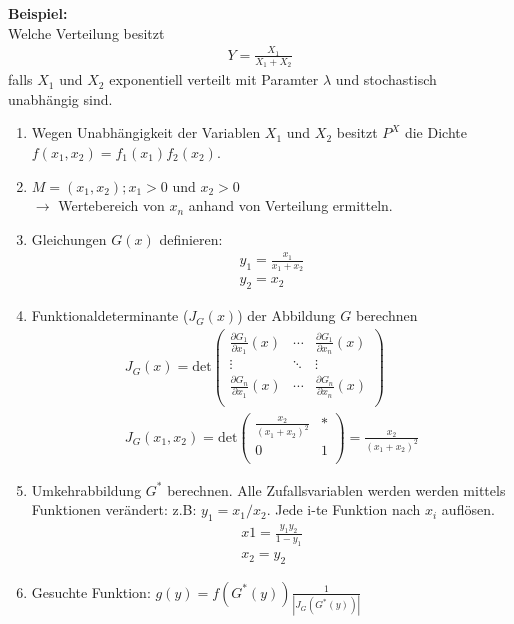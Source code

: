 \documentclass{article}
\begin{document}
\textbf{Beispiel:}\\
Welche Verteilung besitzt
\begin{align}
	Y = \frac{X_1}{X_1 + X_2}
\end{align}
falls $X_1$ und $X_2$ exponentiell verteilt mit Paramter $\lambda$ und stochastisch
unabhängig sind.

\begin{enumerate}
	\item Wegen Unabhängigkeit der Variablen $X_1$ und $X_2$ besitzt $P^X$
		die Dichte $f(x_1,x_2) = f_1(x_1)f_2(x_2)$.
	\item $M = {(x_1, x_2); x_1 > 0 \text{ und } x_2 > 0}$\\
		$\longrightarrow$ Wertebereich von $x_n$ anhand von Verteilung ermitteln.
	\item Gleichungen  $G(x)$ definieren:
		\begin{align}
			y_1 = \frac{x_1}{x_1 + x_2}\\
			y_2 = x_2
		\end{align}
	\item Funktionaldeterminante ($J_{G}(x)$) der Abbildung $G$ berechnen
		\begin{align}
			J_{G}(x) =
			\text{det} \begin{pmatrix}
				\frac{\partial G_1}{\partial x_1} (x) & \cdots & \frac{\partial G_1}{\partial x_n} (x) \\
				\vdots  & \ddots & \vdots  \\
				\frac{\partial G_n}{\partial x_1} (x) & \cdots & \frac{\partial G_n}{\partial x_n} (x) \\
			\end{pmatrix}\\
			J_{G}(x_1,x_2) =
			\text{det} \begin{pmatrix}
				\frac{x_2}{(x_1 + x_2)^2} & * \\
				0 & 1 \\
			\end{pmatrix} = \frac{x_2}{(x_1 + x_2)^2}
		\end{align}
	\item Umkehrabbildung $G^*$ berechnen. Alle Zufallsvariablen werden
		werden mittels Funktionen verändert: z.B: $y_1 = x_1/x_2$.
		Jede i-te Funktion nach $x_i$ auflösen.
		\begin{align}
			x1 = \frac{y_1y_2}{1 - y_1}\\
			x_2 = y_2
		\end{align}
	\item Gesuchte Funktion: $g(y) = f(G^*(y))\frac{1}{|J_G(G^*(y))|}$\\

\end{enumerate}
\end{document}
